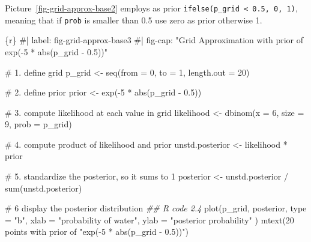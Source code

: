\documentclass[
  letterpaper,
  DIV=11,
  numbers=noendperiod]{scrreprt}
\newenvironment{Shaded}{\begin{snugshade}}{\end{snugshade}}
\newcommand{\AttributeTok}[1]{\textcolor[rgb]{0.40,0.45,0.13}{#1}}
\newcommand{\CommentTok}[1]{\textcolor[rgb]{0.37,0.37,0.37}{#1}}
\newcommand{\DecValTok}[1]{\textcolor[rgb]{0.68,0.00,0.00}{#1}}
\newcommand{\DocumentationTok}[1]{\textcolor[rgb]{0.37,0.37,0.37}{\textit{#1}}}
\newcommand{\FloatTok}[1]{\textcolor[rgb]{0.68,0.00,0.00}{#1}}
\newcommand{\FunctionTok}[1]{\textcolor[rgb]{0.28,0.35,0.67}{#1}}
\newcommand{\InformationTok}[1]{\textcolor[rgb]{0.37,0.37,0.37}{#1}}
\newcommand{\NormalTok}[1]{\textcolor[rgb]{0.00,0.23,0.31}{#1}}
\newcommand{\OtherTok}[1]{\textcolor[rgb]{0.00,0.23,0.31}{#1}}
\newcommand{\SpecialCharTok}[1]{\textcolor[rgb]{0.37,0.37,0.37}{#1}}
\newcommand{\StringTok}[1]{\textcolor[rgb]{0.13,0.47,0.30}{#1}}
\begin{document}
Picture~\ref{fig-grid-approx-base2} employs as prior
\texttt{ifelse(p\_grid\ \textless{}\ 0.5,\ 0,\ 1)}, meaning that if
\texttt{prob} is smaller than 0.5 use zero as prior otherwise 1.

\begin{Shaded}
\begin{Highlighting}[]
\InformationTok{\textasciigrave{}\textasciigrave{}\textasciigrave{}\{r\}}
\CommentTok{\#| label: fig{-}grid{-}approx{-}base3}
\CommentTok{\#| fig{-}cap: "Grid Approximation with prior of \textasciigrave{}exp({-}5 * abs(p\_grid {-} 0.5))\textasciigrave{}"}

\CommentTok{\# 1. define grid}
\NormalTok{p\_grid }\OtherTok{\textless{}{-}} \FunctionTok{seq}\NormalTok{(}\AttributeTok{from =} \DecValTok{0}\NormalTok{, }\AttributeTok{to =} \DecValTok{1}\NormalTok{, }\AttributeTok{length.out =} \DecValTok{20}\NormalTok{)}

\CommentTok{\# 2. define prior}
\NormalTok{prior }\OtherTok{\textless{}{-}} \FunctionTok{exp}\NormalTok{(}\SpecialCharTok{{-}}\DecValTok{5} \SpecialCharTok{*} \FunctionTok{abs}\NormalTok{(p\_grid }\SpecialCharTok{{-}} \FloatTok{0.5}\NormalTok{))}

\CommentTok{\# 3. compute likelihood at each value in grid}
\NormalTok{likelihood }\OtherTok{\textless{}{-}} \FunctionTok{dbinom}\NormalTok{(}\AttributeTok{x =} \DecValTok{6}\NormalTok{, }\AttributeTok{size =} \DecValTok{9}\NormalTok{, }\AttributeTok{prob =}\NormalTok{ p\_grid)}

\CommentTok{\# 4. compute product of likelihood and prior}
\NormalTok{unstd.posterior }\OtherTok{\textless{}{-}}\NormalTok{ likelihood }\SpecialCharTok{*}\NormalTok{ prior}

\CommentTok{\# 5. standardize the posterior, so it sums to 1}
\NormalTok{posterior }\OtherTok{\textless{}{-}}\NormalTok{ unstd.posterior }\SpecialCharTok{/} \FunctionTok{sum}\NormalTok{(unstd.posterior)}

\CommentTok{\# 6 display the posterior distribution }
\DocumentationTok{\#\# R code 2.4}
\FunctionTok{plot}\NormalTok{(p\_grid, posterior,}
  \AttributeTok{type =} \StringTok{"b"}\NormalTok{,}
  \AttributeTok{xlab =} \StringTok{"probability of water"}\NormalTok{, }\AttributeTok{ylab =} \StringTok{"posterior probability"}
\NormalTok{)}
\FunctionTok{mtext}\NormalTok{(}\StringTok{\textquotesingle{}20 points with prior of "exp({-}5 * abs(p\_grid {-} 0.5))"\textquotesingle{}}\NormalTok{)}
\InformationTok{\textasciigrave{}\textasciigrave{}\textasciigrave{}}
\end{Highlighting}
\end{Shaded}
\end{document}
